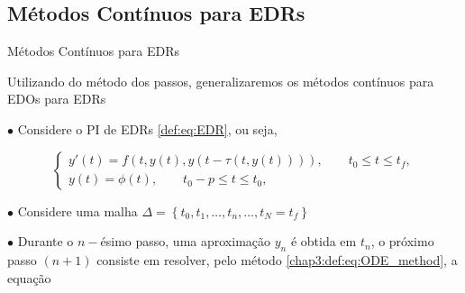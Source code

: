 \documentclass{beamer}
\theoremstyle{plain}
\theoremstyle{definition}
\begin{document}

\subsection{Métodos Contínuos para EDRs}

\begin{frame}{Métodos Contínuos para EDRs}

    Utilizando do método dos passos, generalizaremos os métodos contínuos para EDOs para EDRs

    \phantom{aa} $\bullet$ Considere o PI de EDRs \eqref{def:eq:EDR}, ou seja,

    \begin{equation}
        \begin{cases}
            y'(t) = f(t, y(t), y(t - \tau(t, y(t)))), \qquad t_0 \leq t \leq t_f , \\
            y(t) = \phi(t), \qquad t_0 - p \leq t \leq t_0,
        \end{cases}
        \label{chap3:def:EDR}
    \end{equation}


    \phantom{aa} $\bullet$ Considere uma malha \(\Delta=\left\{t_{0}, t_{1}, \ldots, t_{n}, \ldots\right., \left.t_{N}=t_{f}\right\}\) 


    \phantom{aa} $\bullet$ Durante o $n-$ésimo passo, uma aproximação \( y_{n} \) é obtida em \( t_{n} \), o próximo passo \((n+1)\) consiste em resolver, pelo método \ref{chap3:def:eq:ODE_method}, a equação



\end{frame}


\end{document}
